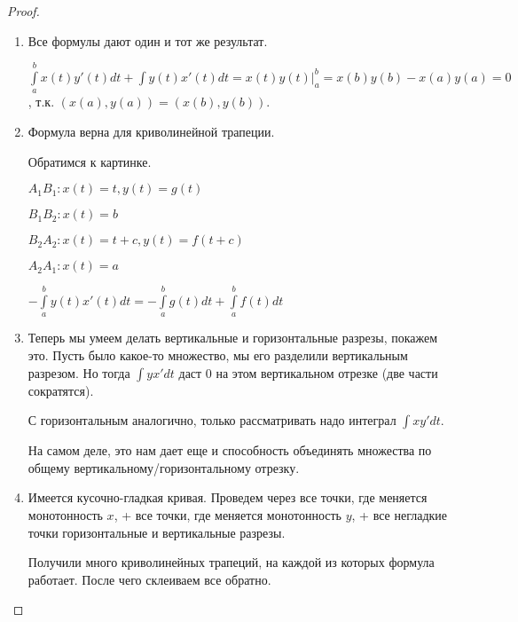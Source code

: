     \begin{proof}

        \begin{enumerate}

            \item Все формулы дают один и тот же результат.

            $\int\limits_a^b x(t)y'(t) dt + \int\limits y(t)x'(t) dt = x(t)y(t) \bigg|_a^b = x(b)y(b) - x(a)y(a) = 0$, т.к. $(x(a), y(a)) = (x(b), y(b))$.

            \item Формула верна для криволинейной трапеции.

            Обратимся к картинке.

            $A_1B_1 \colon x(t) = t, y(t) = g(t)$

            $B_1B_2 \colon x(t) = b$

            $B_2A_2 \colon x(t) = t + c, y(t) = f(t + c)$

            $A_2A_1 \colon x(t) = a$

            $-\int\limits_a^b y(t)x'(t) dt = -\int\limits_a^b g(t) dt + \int\limits_a^b f(t) dt$

            \item Теперь мы умеем делать вертикальные и горизонтальные разрезы, покажем это. 
            Пусть было какое-то множество, мы его разделили вертикальным разрезом. 
            Но тогда $\int y x' dt$ даст 0 на этом вертикальном отрезке (две части сократятся).

            С горизонтальным аналогично, только рассматривать надо интеграл $\int x y' dt$.

            На самом деле, это нам дает еще и способность объединять множества по общему вертикальному/горизонтальному отрезку.

            \item Имеется кусочно-гладкая кривая. 
            Проведем через все точки, где меняется монотонность $x$, + все точки, где меняется монотонность $y$, + все негладкие точки горизонтальные и вертикальные разрезы.
            
            Получили много криволинейных трапеций, на каждой из которых формула работает. После чего склеиваем все обратно.

        \end{enumerate}

    \end{proof}


